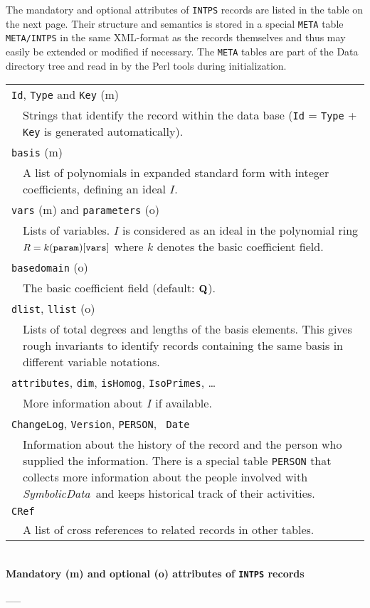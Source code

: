 \documentclass[11pt]{article}
\newcommand{\SD}{{\em Symbo\-lic\-Data}}
\begin{document}
The mandatory and optional attributes of {\tt INTPS} records are
listed in the table on the next page. Their structure and semantics is
stored in a special {\tt META} table {\tt META/INTPS} in the same
XML-format as the records themselves and thus may easily be extended
or modified if necessary. The {\tt META} tables are part of the Data
directory tree and read in by the Perl tools during initialization.

\begin{table}[ht]
\begin{center}
\begin{tabular}{p{8pt}p{11cm}}
\multicolumn{2}{l}{{\tt Id}, {\tt Type} and {\tt Key} (m)}\\ &
Strings that identify the record within the data base ({\tt Id} =
{\tt Type} + {\tt Key} is generated automatically).\\

\multicolumn{2}{l}{{\tt basis} (m)}\\ & A list of polynomials in
expanded standard form with integer coefficients, defining an
ideal $I$.\\

\multicolumn{2}{l}{{\tt vars} (m) and {\tt parameters} (o)}\\ &
Lists of variables. $I$ is considered as an ideal in the
polynomial ring $R=k({\tt param})[{\tt vars}]$ where $k$ denotes
the basic coefficient field.\\

\multicolumn{2}{l}{{\tt basedomain} (o)}\\ & The basic
coefficient field (default: ${\bf Q}$).\\

\multicolumn{2}{l}{{\tt dlist}, {\tt llist} (o)}\\ & Lists of
total degrees and lengths of the basis elements. This gives rough
invariants to identify records containing the same basis in
different variable notations. \\

\multicolumn{2}{l}{{\tt attributes}, {\tt dim}, {\tt isHomog},
{\tt IsoPrimes}, \ldots}\\ & More information about $I$ if
available.\\

\multicolumn{2}{l}{{\tt ChangeLog}, {\tt Version}, {\tt PERSON}, {\tt
Date}}\\ & Information about the history of the record and the person
who supplied the information. There is a special table {\tt PERSON}
that collects more information about the people involved with \SD\ and
keeps historical track of their activities. \\

\multicolumn{2}{l}{{\tt CRef}}\\ & A list of cross references to
related records in other tables.
\end{tabular}\\[12pt]
{\bf Mandatory (m) and optional (o) attributes of {\tt INTPS} records}
\end{center}
\_\hrulefill\_
\end{table}
\end{document}
